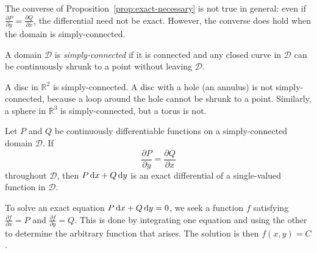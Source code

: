 \documentclass[a4paper]{article}
\begin{document}
\begin{remark}
  The converse of Proposition~\ref{prop:exact-necessary} is not true in general: even if $\frac{\partial P}{\partial y} = \frac{\partial Q}{\partial x}$, the differential need not be exact. However, the converse does hold when the domain is simply-connected.
\end{remark}

\begin{defi}
  A domain $\mathcal{D}$ is \emph{simply-connected} if it is connected and any closed curve in $\mathcal{D}$ can be continuously shrunk to a point without leaving $\mathcal{D}$.
\end{defi}

\begin{eg}
  A disc in $\mathbb{R}^2$ is simply-connected. A disc with a hole (an annulus) is not simply-connected, because a loop around the hole cannot be shrunk to a point. Similarly, a sphere in $\mathbb{R}^3$ is simply-connected, but a torus is not.
\end{eg}

\begin{thm}\label{thm:exactness}
  Let $P$ and $Q$ be continuously differentiable functions on a simply-connected domain $\mathcal{D}$. If
  \[
    \frac{\partial P}{\partial y} = \frac{\partial Q}{\partial x}
  \]
  throughout $\mathcal{D}$, then $P\,\mathrm{d} x + Q\,\mathrm{d} y$ is an exact differential of a single-valued function in $\mathcal{D}$.
\end{thm}

\begin{remark}
  To solve an exact equation $P\,\mathrm{d} x + Q\,\mathrm{d} y = 0$, we seek a function $f$ satisfying $\frac{\partial f}{\partial x} = P$ and $\frac{\partial f}{\partial y} = Q$. This is done by integrating one equation and using the other to determine the arbitrary function that arises. The solution is then $f(x,y) = C$.
\end{remark}
\end{document}
